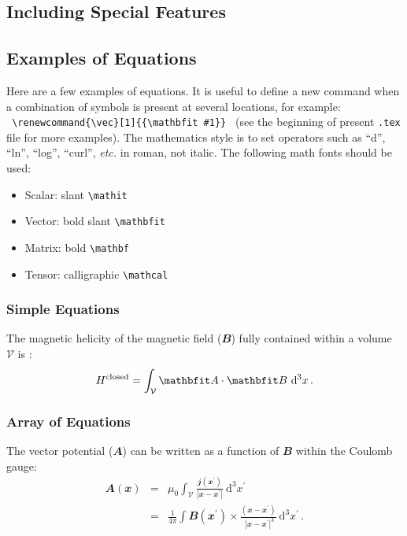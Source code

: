 \documentclass[namedreferences]{solarphysics}
\renewcommand{\vec}[1]{{\mathbfit #1}}
\newcommand{\vol}{ {\mathcal V} }
\newcommand{\dv}{~{\mathrm d}^3 x}
\newcommand{\intv}{\int_{\vol}^{}}
\newcommand{\avec}{ \vec A}
\newcommand{\bb}{\vec B}
\newcommand{\jj}{ \vec j}
\newcommand{\xx}{ \vec x}
\begin{document}
\begin{article}
\section{Including Special Features} %
      \label{S-features}      

\subsection{Examples of Equations} %
  \label{S-equations}
Here are a few examples of equations. It is useful to define
a new command when a combination of symbols is present at several 
locations, for example:\\
  \verb+ \renewcommand{\vec}[1]{{\mathbfit #1}} + 
(see the beginning of present \texttt{.tex} file for more examples). 
The mathematics style is to set operators such as ``d'', ``ln'', ``log'', 
``curl'', \textit{etc.} in roman, not italic.
The following math fonts should be used:
\begin{itemize}
\item Scalar: slant \verb+\mathit+
\item Vector: bold slant \verb+\mathbfit+
\item Matrix: bold \verb+\mathbf+
\item Tensor: calligraphic \verb+\mathcal+
\end{itemize}
  
\subsubsection{Simple Equations} %
  \label{S-simple-equations}
 The magnetic helicity of the magnetic field ($\vec{B}$) fully contained 
within a volume $\vol $ is \citep{Elsasser56}:
   \begin{equation}  \label{Eq-H-def}
     H^{\rm closed} = \intv \avec \cdot \bb \dv \,.
   \end{equation}

\subsubsection{Array of Equations} %
  \label{S-array-equations}
The vector potential ($\avec$) can be written as a function of $\bb$
within the Coulomb gauge:
   \begin{eqnarray}   
     \avec (\xx) &=& \mu_{0}\intv \frac{\jj (\xx  ^\prime)}
                     { | \xx - \xx  ^\prime |} \dv ^\prime          
                       \nonumber \\      %
                 &=& \frac{1}{4\pi} \int \bb (\xx ^\prime ) \times
                     \frac{(\xx  - \xx ^\prime)}{\,\, |\xx - \xx ^\prime |^3}  
                                           \dv ^\prime   \,. 
                       \label{Eq-A-B}    %
   \end{eqnarray}


\end{article}
\end{document}
